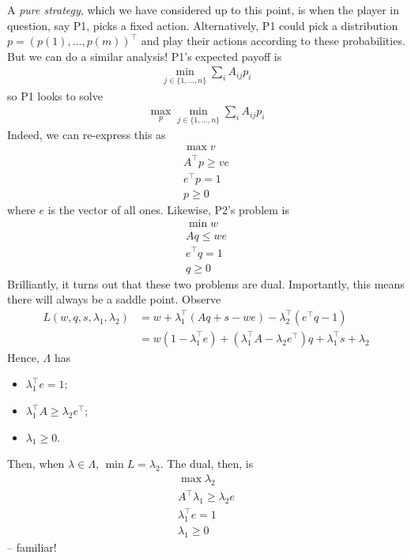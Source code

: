 \documentclass{../../template/note}
\begin{document}
    A \emph{pure strategy}, which we have considered up to this point, is when the player in question, say P1, picks a fixed action. Alternatively, P1 could pick a distribution $p = (p(1), \dots, p(m))^\intercal$ and play their actions according to these probabilities. But we can do a similar analysis! P1's expected payoff is
    \begin{align*}
        \min_{j \in \{1, \dots, n\}} \sum_i A_{ij} p_i
    \end{align*}
    so P1 looks to solve
    \begin{align*}
        \max_p \min_{j \in \{1, \dots, n\}} \sum_i A_{ij} p_i
    \end{align*}
    Indeed, we can re-express this as
    \begin{align*}
        \max v \\
        A^\intercal p \geq ve \\
        e^\intercal p = 1 \\
        p \geq 0
    \end{align*}
    where $e$ is the vector of all ones. Likewise, P2's problem is
    \begin{align*}
        \min w \\
        Aq \leq we \\
        e^\intercal q = 1 \\
        q \geq 0
    \end{align*}
    Brilliantly, it turns out that these two problems are dual. Importantly, this means there will always be a saddle point. Observe
    \begin{align*}
        L(w, q, s, \lambda_1, \lambda_2) &= w + \lambda_1^\intercal (Aq+s-we) - \lambda_2^\intercal (e^\intercal q - 1) \\
        &= w(1-\lambda_1^\intercal e) + (\lambda_1^\intercal A - \lambda_2  e^\intercal) q + \lambda_1^\intercal s + \lambda_2
    \end{align*}
    Hence, $\Lambda$ has
    \begin{itemize}
        \item $\lambda_1^\intercal e = 1$;
        \item $\lambda_1^\intercal A \geq \lambda_2 e^\intercal$;
        \item $\lambda_1 \geq 0$.
    \end{itemize}
    Then, when $\lambda \in \Lambda$, $\min L = \lambda_2$. The dual, then, is
    \begin{align*}
        \max \lambda_2 \\
        A^\intercal \lambda_1 \geq \lambda_2e \\
        \lambda_1^\intercal e = 1 \\
        \lambda_1 \geq 0
    \end{align*}
    -- familiar!
\end{document}
